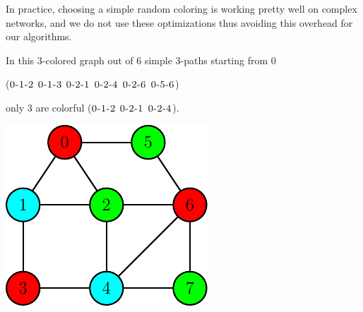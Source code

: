 In practice, choosing a simple random coloring is working pretty well on complex networks, and we do not use these optimizations thus avoiding this overhead for our algorithms.\medskip

\begin{minipage}{0.55\textwidth}\raggedright
	\begin{esempio}
		In this $3$-colored graph out of $6$ simple $3$-paths starting from $0$\medskip
		
		($\textsc{0-1-2}$ $\textsc{0-1-3}$ $\textsc{0-2-1}$ $\textsc{0-2-4}$ $\textsc{0-2-6}$ $\textsc{0-5-6}$)\medskip
		
		only $3$ are colorful ($\textsc{0-1-2}$ $\textsc{0-2-1}$ $\textsc{0-2-4}$).
	\end{esempio}
\end{minipage}
\begin{minipage}{0.35\textwidth}
	\includegraphics[width=\linewidth]{figure/figure-2-6}
\end{minipage}

\noindent

\clearpage

